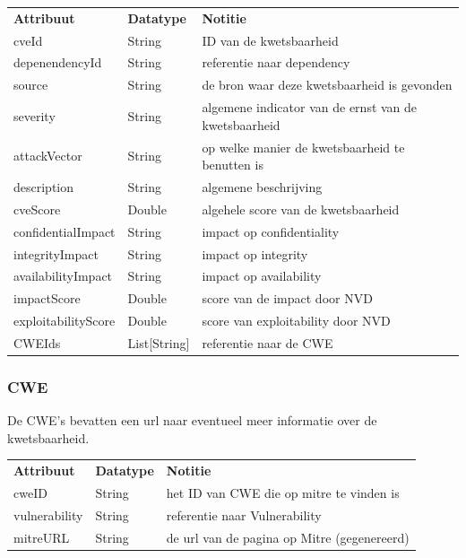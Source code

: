 \begin{tabular}{lll}
    \textbf{Attribuut}  & \textbf{Datatype} & \textbf{Notitie}                                     \\
    cveId               & String            & ID van de kwetsbaarheid                              \\
    depenendencyId      & String            & referentie naar dependency                           \\
    source              & String            & de bron waar deze kwetsbaarheid is gevonden          \\
    severity            & String            & algemene indicator van de ernst van de kwetsbaarheid \\
    attackVector        & String            & op welke manier de kwetsbaarheid te benutten is      \\
    description         & String            & algemene beschrijving                                \\
    cveScore            & Double            & algehele score van de kwetsbaarheid                  \\
    confidentialImpact  & String            & impact op confidentiality                            \\
    integrityImpact     & String            & impact op integrity                                  \\
    availabilityImpact  & String            & impact op availability                               \\
    impactScore         & Double            & score van de impact door NVD                         \\
    exploitabilityScore & Double            & score van exploitability door NVD                    \\
    CWEIds              & List[String]      & referentie naar de CWE                               \\
\end{tabular}

\subsubsection{CWE}\label{subsubsec:cwe}
De CWE's bevatten een url naar eventueel meer informatie over de kwetsbaarheid.

\begin{tabular}{lll}
    \textbf{Attribuut} & \textbf{Datatype} & \textbf{Notitie}                            \\
    cweID              & String            & het ID van CWE die op mitre te vinden is    \\
    vulnerability      & String            & referentie naar Vulnerability               \\
    mitreURL           & String            & de url van de pagina op Mitre (gegenereerd) \\
\end{tabular}

